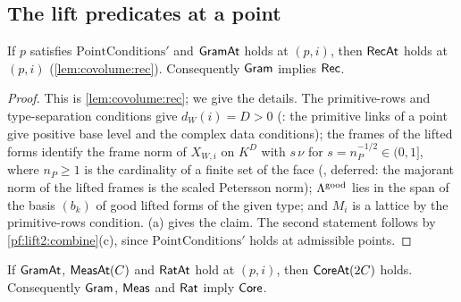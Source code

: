 \subsection{The lift predicates at a point}\label{sec:pf:lift2:liftpred}

\begin{proposition}[Recursion]\label{pf:lift2:rec}
If $p$ satisfies $\mathrm{PointConditions}'$ and $\mathsf{GramAt}$ holds at $(p,i)$, then $\mathsf{RecAt}$ holds
at $(p,i)$ (\cref{lem:covolume:rec}). Consequently $\mathsf{Gram}$ implies $\mathsf{Rec}$.
\end{proposition}

\begin{proof}
This is \cref{lem:covolume:rec}; we give the details. The primitive-rows and type-separation conditions give
$d_W(i)=D>0$ (: the primitive
links of a point give positive base level and the complex data conditions); the frames of the lifted forms identify
the frame norm of $X_{W,i}$ on $K^D$ with $s\,\nu$ for $s=n_P^{-1/2}\in(0,1]$, where $n_P\ge1$ is the cardinality of a
finite set of the face (, deferred: the majorant
norm of the lifted frames is the scaled Petersson norm); $\Lambda^{\mathrm{good}}$ lies in the span of the basis $(b_k)$ of
good lifted forms of the given type; and $M_i$ is a lattice by the primitive-rows condition.
(a) gives the claim. The second statement follows by \cref{pf:lift2:combine}(c), since
$\mathrm{PointConditions}'$ holds at admissible points.
\end{proof}

\begin{proposition}\label{pf:lift2:core}
If $\mathsf{GramAt}$, $\mathsf{MeasAt}(C)$ and $\mathsf{RatAt}$ hold at $(p,i)$, then $\mathsf{CoreAt}(2C)$
holds. Consequently $\mathsf{Gram}$, $\mathsf{Meas}$ and $\mathsf{Rat}$ imply $\mathsf{Core}$.
\end{proposition}


